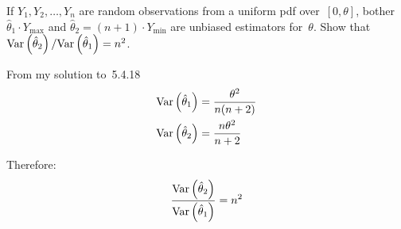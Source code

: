 \begin{problem}
   If ${Y_1,Y_2,\ldots,Y_n}$ are random observations from a uniform pdf over~${[0,\theta]}$, bother ${\hat{\theta}_1 \cdot Y_{\max}}$ and ${\hat{\theta}_2 = (n+1) \cdot Y_{\min}}$ are unbiased estimators for~$\theta$.  Show that ${\text{Var}\left(\hat{\theta}_2\right) / \text{Var}\left(\hat{\theta}_1\right) = n^2}$.
\end{problem}

From my solution to~5.4.18
\begin{align}
  \text{Var}\left(\hat{\theta}_1\right) &= \frac{\theta^{2}}{n(n+2)}\\
  \text{Var}\left(\hat{\theta}_2\right) &= \frac{n\theta^{2}}{n+2}
\end{align}

Therefore:
\begin{equation}
  \frac{\text{Var}\left(\hat{\theta}_2\right)}{\text{Var}\left(\hat{\theta}_1\right)} = n^2
\end{equation}
